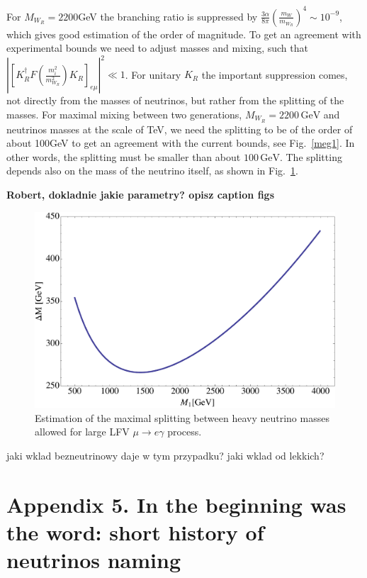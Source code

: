 \documentclass[twocolumn,superscriptaddress,showpacs,prl,nofootinbib,floatfix]{revtex4}
\begin{document}
For $M_{W_{R}}=2200$GeV the branching ratio is suppressed by $\frac{3\alpha}{8\pi}\left(\frac{m_{W}}{m_{W_{R}}}\right)^{4}\sim10^{-9}$,
which gives good estimation of the order of magnitude. To get an agreement
with experimental bounds we need to adjust masses and mixing, such
that $\left|\left[K_{R}^{\dagger}F\left(\frac{m_{i}^{2}}{m_{W_{R}}^{2}}\right)K_{R}\right]_{e\mu}\right|^{2}\ll1$.
For unitary $K_{R}$ the important suppression comes, not directly
from the masses of neutrinos, but rather from the splitting of the
masses. For maximal mixing between two generations, $M_{W_{R}}=2200\,\mathrm{GeV}$
and neutrinos masses at the scale of TeV, we need the splitting to
be of the order of about 100GeV to get an agreement with the current
bounds, see Fig.~\ref{meg1}. In other words, the splitting must be smaller than about $100\,\mathrm{GeV}$.
The splitting depends also on the mass of the neutrino itself, as shown in Fig.~\ref{meg2}.

  {\bf Robert, dokladnie jakie parametry? opisz caption figs}
  
  \begin{figure}[h!]
  \begin{center}
  \includegraphics[scale=0.5]{Plot2}
  \caption{Estimation of the maximal splitting between heavy neutrino masses allowed for large LFV $\mu \to e \gamma$ process.   
  }
  \end{center}\label{meg2}
  \end{figure}
  

jaki wklad bezneutrinowy daje w tym przypadku? jaki wklad od lekkich?



\section{Appendix 5. In the beginning was the word: short history of neutrinos naming  \label{apphis}} 
\end{document}
